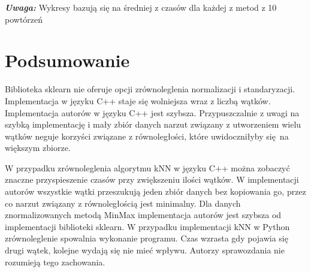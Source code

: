 \documentclass{scrartcl}
\begin{document}
\textbf{\textit{Uwaga:}} Wykresy bazują się na średniej z czasów dla każdej z metod z 10 powtórzeń









\section{Podsumowanie}

Biblioteka sklearn nie oferuje opcji zrównoleglenia normalizacji i standaryzacji. Implementacja w języku C++ staje się wolniejsza wraz z liczbą wątków. Implementacja autorów w języku C++ jest szybsza. Przypuszczalnie z uwagi na szybką implementację i mały zbiór danych narzut związany z utworzeniem wielu wątków neguje korzyści związane z równoległości, które uwidoczniłyby się na większym zbiorze.

W przypadku zrównoleglenia algorytmu kNN w języku C++ można zobaczyć znaczne przyspieszenie czasów przy zwiększeniu ilości wątków. W implementacji autorów wszystkie wątki przeszukują jeden zbiór danych bez kopiowania go, przez co narzut związany z równoległością jest minimalny. Dla danych znormalizowanych metodą MinMax implementacja autorów jest szybsza od implementacji biblioteki sklearn. 
W przypadku implementacji kNN w Python zrównoleglenie spowalnia wykonanie programu. Czas wzrasta gdy pojawia się drugi wątek, kolejne wydają się nie mieć wpływu. Autorzy sprawozdania nie rozumieją tego zachowania.







\end{document}
